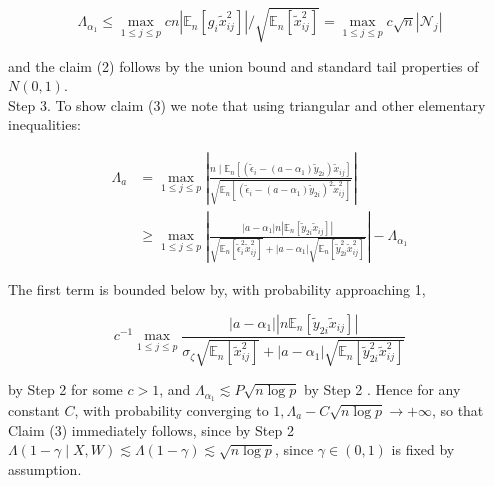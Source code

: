 \documentclass[10pt]{article}
\begin{document}
\[
\Lambda_{\alpha_{1}} \leqslant \max _{1 \leqslant j \leqslant p} c n\left|\mathbb{E}_{n}\left[g_{i} \tilde{x}_{i j}^{2}\right]\right| / \sqrt{\mathbb{E}_{n}\left[\tilde{x}_{i j}^{2}\right]}=\max _{1 \leqslant j \leqslant p} c \sqrt{n}\left|\mathcal{N}_{j}\right|
\]

and the claim (2) follows by the union bound and standard tail properties of \(N(0,1)\).\\
Step 3. To show claim (3) we note that using triangular and other elementary inequalities:

\[
\begin{aligned}
\Lambda_{a} & =\max _{1 \leqslant j \leqslant p}\left|\frac{n \mid \mathbb{E}_{n}\left[\left(\tilde{\epsilon}_{i}-\left(a-\alpha_{1}\right) \tilde{y}_{2 i}\right) \tilde{x}_{i j}\right]}{\sqrt{\mathbb{E}_{n}\left[\left(\tilde{\epsilon}_{i}-\left(a-\alpha_{1}\right) \tilde{y}_{2 i}\right)^{2} \tilde{x}_{i j}^{2}\right]}}\right| \\
& \geqslant \max _{1 \leqslant j \leqslant p}\left|\frac{\left|a-\alpha_{1}\right| n\left|\mathbb{E}_{n}\left[\tilde{y}_{2 i} \tilde{x}_{i j}\right]\right|}{\sqrt{\mathbb{E}_{n}\left[\tilde{\epsilon}_{i}^{2} \tilde{x}_{i j}^{2}\right]}+\left|a-\alpha_{1}\right| \sqrt{\mathbb{E}_{n}\left[\tilde{y}_{2 i}^{2} \tilde{x}_{i j}^{2}\right]}}\right|-\Lambda_{\alpha_{1}}
\end{aligned}
\]

The first term is bounded below by, with probability approaching 1,

\[
c^{-1} \max _{1 \leqslant j \leqslant p} \frac{\left|a-\alpha_{1}\right|\left|n \mathbb{E}_{n}\left[\tilde{y}_{2 i} \tilde{x}_{i j}\right]\right|}{\sigma_{\zeta} \sqrt{\mathbb{E}_{n}\left[\tilde{x}_{i j}^{2}\right]}+\left|a-\alpha_{1}\right| \sqrt{\mathbb{E}_{n}\left[\tilde{y}_{2 i}^{2} \tilde{x}_{i j}^{2}\right]}}
\]

by Step 2 for some \(c>1\), and \(\Lambda_{\alpha_{1}} \lesssim P \sqrt{n \log p}\) by Step 2 . Hence for any constant \(C\), with probability converging to \(1, \Lambda_{a}-C \sqrt{n \log p} \rightarrow+\infty\), so that Claim (3) immediately follows, since by Step 2 \(\Lambda(1-\gamma \mid X, W) \lesssim \Lambda(1-\gamma) \lesssim \sqrt{n \log p}\), since \(\gamma \in(0,1)\) is fixed by assumption.
\end{document}
